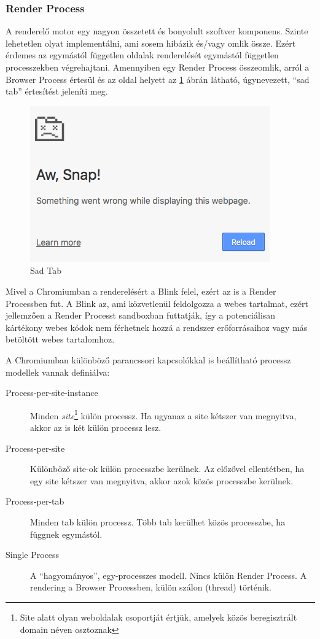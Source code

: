 \documentclass[12pt]{report}
\begin{document}
\subsubsection{Render Process}
A renderelő motor egy nagyon összetett és bonyolult szoftver komponens. Szinte lehetetlen
olyat implementálni, ami sosem hibázik és/vagy omlik össze. \cite{bib:chromium-multi-process}
Ezért érdemes az egymástól független oldalak renderelését egymástól független
processzekben végrehajtani. Amennyiben egy Render Process összeomlik, arról a
Browser Process értesül és az oldal helyett az \ref{fig:sad-tab} ábrán látható,
úgynevezett, ``sad tab'' értesítést jeleníti meg.

\begin{figure}[h]
    \centering
    \includegraphics[scale=0.8]{sad-tab}
    \caption{
        \label{fig:sad-tab}
        Sad Tab
    }
\end{figure}

Mivel a Chromiumban a renderelésért a Blink felel, ezért az is a Render Processben fut.
A Blink az, ami közvetlenül feldolgozza a webes tartalmat, ezért jellemzően a
Render Processt sandboxban futtatják, így a potenciálisan kártékony webes kódok nem
férhetnek hozzá a rendszer erőforrásaihoz vagy más betöltött webes tartalomhoz.

A Chromiumban különböző parancssori kapcsolókkal is beállítható processz modellek
vannak definiálva:
\begin{description}
    \item[Process-per-site-instance]
        Minden \textit{site}\footnote{Site alatt olyan weboldalak csoportját értjük, amelyek
        közös beregisztrált domain néven osztoznak} külön processz.
        Ha ugyanaz a site kétszer van megnyitva, akkor az is két külön processz lesz.
    \item[Process-per-site]
        Különböző site-ok külön processzbe kerülnek. Az előzővel ellentétben, ha egy site
        kétszer van megnyitva, akkor azok közös processzbe kerülnek.
    \item[Process-per-tab]
        Minden tab külön processz. Több tab kerülhet közös processzbe, ha függnek egymástól.
    \item[Single Process]
        A ``hagyományos'', egy-processzes modell. Nincs külön Render Process. A rendering
        a Browser Processben, külön szálon (thread) történik.
\end{description}
\end{document}
